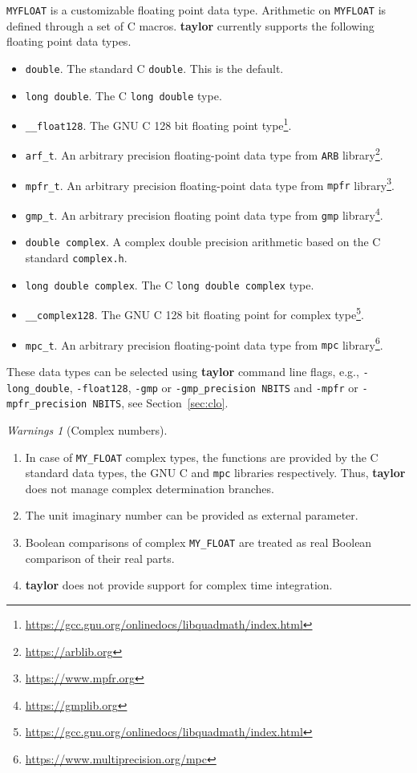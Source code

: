 \documentclass[10pt]{article}
\theoremstyle{remark}
\newtheorem*{warnings}{Warnings}
\newcommand{\taylorname}{{\bf taylor}}
\newcommand{\myfloat}{{\tt MY\symbol{95}FLOAT}}
\begin{document}
\myfloat{} is a customizable floating point data type.  Arithmetic on
\myfloat{} is defined through a set of C macros. \taylorname{}
currently supports the following floating point data types.
\begin{itemize}
    \item \verb+double+.  The standard C \verb+double+.  This is the
      default.
    \item \verb+long double+. The C \verb+long double+ type.
    \item \verb+__float128+. The GNU C 128 bit floating point
      type\footnote{\url{https://gcc.gnu.org/onlinedocs/libquadmath/index.html}}.
    \item \verb+arf_t+. An arbitrary precision floating-point data
      type from {\tt ARB}
      library\footnote{\url{https://arblib.org}}.
    \item \verb+mpfr_t+. An arbitrary precision floating-point data
      type from {\tt mpfr}
      library\footnote{\url{https://www.mpfr.org}}.
    \item \verb+gmp_t+. An arbitrary precision floating point data
      type from {\tt gmp}
      library\footnote{\url{https://gmplib.org}}.
    \item \verb+double complex+. A complex double precision arithmetic
      based on the C standard \verb+complex.h+.
    \item \verb+long double complex+. The C \verb+long double complex+ type.
    \item \verb+__complex128+. The GNU C 128 bit floating point for
      complex
      type\footnote{\url{https://gcc.gnu.org/onlinedocs/libquadmath/index.html}}.
    \item \verb+mpc_t+. An arbitrary precision floating-point data type
      from {\tt mpc}
      library\footnote{\url{https://www.multiprecision.org/mpc}}.
\end{itemize}
These data types can be selected using \taylorname{} command line
flags, e.g., \verb+-long_double+, \verb+-float128+, \verb+-gmp+ or
\verb+-gmp_precision NBITS+ and \verb+-mpfr+ or
\verb+-mpfr_precision NBITS+, see Section~\ref{sec:clo}.

\medskip 

\begin{warnings}[Complex numbers]
 \begin{enumerate}
 \renewcommand{\theenumi}{\arabic{enumi}}
 \renewcommand{\labelenumi}{\theenumi.)}
     \item In case of \verb+MY_FLOAT+ complex types, the functions are
       provided by the C standard data types, the GNU C and \verb+mpc+
       libraries respectively. Thus, \taylorname{} does not manage
       complex determination branches.
     \item The unit imaginary number can be provided as external
       parameter.
     \item Boolean comparisons of complex \verb+MY_FLOAT+ are treated
       as real Boolean comparison of their real parts.
     \item \taylorname{} does not provide support for complex time
       integration.
 \end{enumerate}
\end{warnings}
\end{document}
